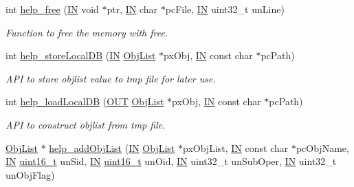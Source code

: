 \begin{DoxyCompactItemize}
int \hyperlink{group__LIBHELP_ga119da297e15f5e43ef6d6ed4aabddd41}{help\-\_\-free} (\hyperlink{group__LIBHELP_gac2bbd6d630a06a980d9a92ddb9a49928}{I\-N} void $\ast$ptr, \hyperlink{group__LIBHELP_gac2bbd6d630a06a980d9a92ddb9a49928}{I\-N} char $\ast$pc\-File, \hyperlink{group__LIBHELP_gac2bbd6d630a06a980d9a92ddb9a49928}{I\-N} uint32\-\_\-t un\-Line)
\begin{DoxyCompactList}\small\item\em Function to free the memory with free. \end{DoxyCompactList}\item 
int \hyperlink{group__LIBHELP_ga6bb6513ba70c6cfc1333820665b274e0}{help\-\_\-store\-Local\-D\-B} (\hyperlink{group__LIBHELP_gac2bbd6d630a06a980d9a92ddb9a49928}{I\-N} \hyperlink{structObjList}{Obj\-List} $\ast$px\-Obj, \hyperlink{group__LIBHELP_gac2bbd6d630a06a980d9a92ddb9a49928}{I\-N} const char $\ast$pc\-Path)
\begin{DoxyCompactList}\small\item\em A\-P\-I to store objlist value to tmp file for later use. \end{DoxyCompactList}\item 
int \hyperlink{group__LIBHELP_ga24fe0e9dca60ba43295e2d270a76769e}{help\-\_\-load\-Local\-D\-B} (\hyperlink{group__LIBHELP_gaec78e7a9e90a406a56f859ee456e8eae}{O\-U\-T} \hyperlink{structObjList}{Obj\-List} $\ast$px\-Obj, \hyperlink{group__LIBHELP_gac2bbd6d630a06a980d9a92ddb9a49928}{I\-N} const char $\ast$pc\-Path)
\begin{DoxyCompactList}\small\item\em A\-P\-I to construct objlist from tmp file. \end{DoxyCompactList}\item 
\hyperlink{structObjList}{Obj\-List} $\ast$ \hyperlink{group__LIBHELP_gaff5235d94dc4e88725e95abeaf5b77f4}{help\-\_\-add\-Obj\-List} (\hyperlink{group__LIBHELP_gac2bbd6d630a06a980d9a92ddb9a49928}{I\-N} \hyperlink{structObjList}{Obj\-List} $\ast$px\-Obj\-List, \hyperlink{group__LIBHELP_gac2bbd6d630a06a980d9a92ddb9a49928}{I\-N} const char $\ast$pc\-Obj\-Name, \hyperlink{group__LIBHELP_gac2bbd6d630a06a980d9a92ddb9a49928}{I\-N} \hyperlink{commondefs_8h_adf4d876453337156dde61095e1f20223}{uint16\-\_\-t} un\-Sid, \hyperlink{group__LIBHELP_gac2bbd6d630a06a980d9a92ddb9a49928}{I\-N} \hyperlink{commondefs_8h_adf4d876453337156dde61095e1f20223}{uint16\-\_\-t} un\-Oid, \hyperlink{group__LIBHELP_gac2bbd6d630a06a980d9a92ddb9a49928}{I\-N} uint32\-\_\-t un\-Sub\-Oper, \hyperlink{group__LIBHELP_gac2bbd6d630a06a980d9a92ddb9a49928}{I\-N} uint32\-\_\-t un\-Obj\-Flag)

\end{DoxyCompactItemize}
